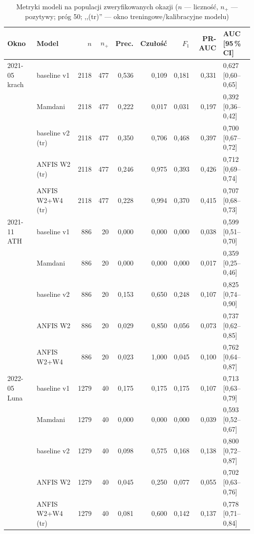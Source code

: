 \begin{table}[H]\centering\scriptsize\setlength{\tabcolsep}{3.5pt}
\caption{Metryki modeli na populacji zweryfikowanych okazji ($n$ --- liczność, $n_+$ --- pozytywy;
  próg 50; ,,(tr)'' --- okno treningowe/kalibracyjne modelu)}\label{tab:models}
\begin{tabular}{llrrrrrrl}
\toprule
Okno & Model & $n$ & $n_+$ & Prec. & Czułość & $F_1$ & PR-AUC & AUC [95\,\% CI] \\
\midrule
2021-05 krach & baseline v1  & 2118 & 477 & 0{,}536 & 0{,}109 & 0{,}181 & 0{,}331 & 0{,}627 [0{,}60--0{,}65] \\
 & Mamdani      & 2118 & 477 & 0{,}222 & 0{,}017 & 0{,}031 & 0{,}197 & 0{,}392 [0{,}36--0{,}42] \\
 & baseline v2 (tr) & 2118 & 477 & 0{,}350 & 0{,}706 & 0{,}468 & 0{,}397 & 0{,}700 [0{,}67--0{,}72] \\
 & ANFIS W2 (tr) & 2118 & 477 & 0{,}246 & 0{,}975 & 0{,}393 & 0{,}426 & 0{,}712 [0{,}69--0{,}74] \\
 & ANFIS W2+W4 (tr) & 2118 & 477 & 0{,}228 & 0{,}994 & 0{,}370 & 0{,}415 & 0{,}707 [0{,}68--0{,}73] \\
\midrule
2021-11 ATH & baseline v1  & 886 & 20 & 0{,}000 & 0{,}000 & 0{,}000 & 0{,}038 & 0{,}599 [0{,}51--0{,}70] \\
 & Mamdani      & 886 & 20 & 0{,}000 & 0{,}000 & 0{,}000 & 0{,}017 & 0{,}359 [0{,}25--0{,}46] \\
 & baseline v2  & 886 & 20 & 0{,}153 & 0{,}650 & 0{,}248 & 0{,}107 & 0{,}825 [0{,}74--0{,}90] \\
 & ANFIS W2     & 886 & 20 & 0{,}029 & 0{,}850 & 0{,}056 & 0{,}073 & 0{,}737 [0{,}62--0{,}85] \\
 & ANFIS W2+W4  & 886 & 20 & 0{,}023 & 1{,}000 & 0{,}045 & 0{,}100 & 0{,}762 [0{,}64--0{,}87] \\
\midrule
2022-05 Luna & baseline v1  & 1279 & 40 & 0{,}175 & 0{,}175 & 0{,}175 & 0{,}107 & 0{,}713 [0{,}63--0{,}79] \\
 & Mamdani      & 1279 & 40 & 0{,}000 & 0{,}000 & 0{,}000 & 0{,}039 & 0{,}593 [0{,}52--0{,}67] \\
 & baseline v2  & 1279 & 40 & 0{,}098 & 0{,}575 & 0{,}168 & 0{,}138 & 0{,}800 [0{,}72--0{,}87] \\
 & ANFIS W2     & 1279 & 40 & 0{,}045 & 0{,}250 & 0{,}077 & 0{,}055 & 0{,}702 [0{,}63--0{,}76] \\
 & ANFIS W2+W4 (tr) & 1279 & 40 & 0{,}081 & 0{,}600 & 0{,}142 & 0{,}137 & 0{,}778 [0{,}71--0{,}84] \\

\end{tabular}
\end{table}
